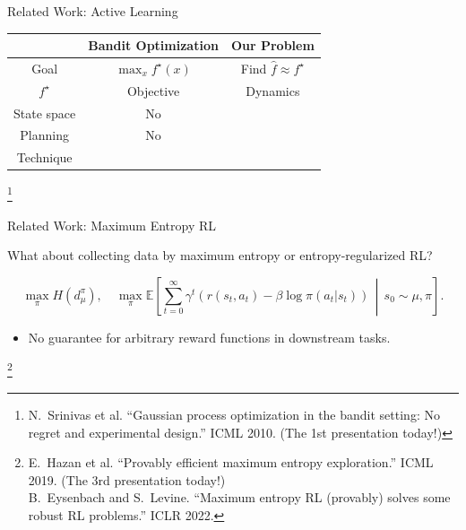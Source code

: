 \documentclass[11pt,aspectratio=169,handout]{beamer} %
\newcommand\reffootnote[1]{%
\begingroup
\renewcommand\thefootnote{}\footnote{\hspace{-20px}\color{DarkGray}#1\vspace{5px}}%
\addtocounter{footnote}{-1}%
\endgroup
}
\begin{document}
\begin{frame}{Related Work: Active Learning}
    \renewcommand{\arraystretch}{1.25}
    \begin{table}[h]
        \centering
        \begin{tabular}{c|c|c}
        \toprule
          & Bandit Optimization & Our Problem \\
        \midrule
          Goal & $\displaystyle\max_{x} f^\star(x)$ & Find $\hat{f}\approx f^\star$ \\
          $f^\star$ & Objective & Dynamics \\
          State space & No & \color{ETHRed}{Continuous} \\
          Planning & No & \color{ETHRed}{Yes} \\
          Technique & \multicolumn{2}{c}{\color{ETHRed}{Optimism in the face of uncertainty}} \\
        \bottomrule
        \end{tabular}
    \end{table}

    \reffootnote{N.~Srinivas et al. ``Gaussian process optimization in the bandit setting: No regret and experimental design.'' ICML 2010. (The 1st presentation today!)}
\end{frame}


\begin{frame}{Related Work: Maximum Entropy RL}

    What about collecting data by maximum entropy or entropy-regularized RL?
    
    $$
    \max_{\pi} H\left(d^{\pi}_\mu\right), \quad
        \max_{\pi} \mathbb{E}\left[ \sum_{t=0}^\infty \gamma^t (r(s_t, a_t) - \beta\log\pi(a_t|s_t)) \,\middle|\, s_0\sim \mu , \pi \right].
    $$
    
    \begin{itemize}
        \item \textcolor{ETHRed}{No guarantee} for arbitrary reward functions in downstream tasks.
    \end{itemize}

    \reffootnote{E.~Hazan et al. ``Provably efficient maximum entropy exploration.'' ICML 2019. (The 3rd presentation today!)\\
    B.~Eysenbach and S.~Levine. ``Maximum entropy RL (provably) solves some robust RL problems.'' ICLR 2022.}
\end{frame}
\end{document}
